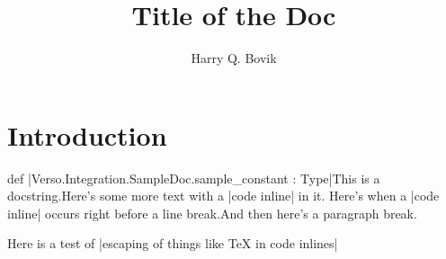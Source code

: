 \documentclass{memoir}
\title{\sffamily Title of the Doc}
\author{\sffamily Harry Q. Bovik}
\date{\sffamily }
\begin{document}
\frontmatter

\begin{titlingpage}
\maketitle
\end{titlingpage}

\tableofcontents

\mainmatter

\chapter*{Introduction}
\begin{docstringBox}{def}
\LeanVerb|Verso.Integration.SampleDoc.sample_constant : Type|\tcblower This is a docstring.Here's some more text with a \LeanVerb|code inline| in it.
Here's when a \LeanVerb|code inline|
occurs right before a line break.And then here's a paragraph break.
\end{docstringBox}

Here is a test of \LeanVerb|escaping of things like TeX in code inlines|
\end{document}
